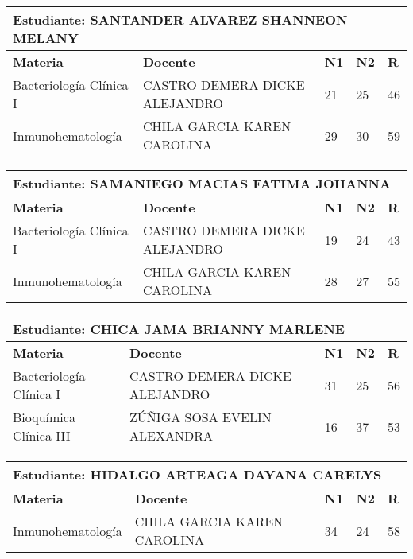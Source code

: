 \small
\begin{tabularx}{\textwidth}{|p{5cm}|p{7cm}|X|X|X|}
\hline
\multicolumn{5}{|p{\dimexpr\textwidth-2\tabcolsep-2\arrayrulewidth}|}{\textbf{Estudiante: SANTANDER ALVAREZ SHANNEON MELANY }}\\\hline
\textbf{Materia} & \textbf{Docente} & \textbf{N1} & \textbf{N2} & \textbf{R} \\ \hline
Bacteriología Clínica I & CASTRO DEMERA DICKE ALEJANDRO  & 21 & 25& 46 \\ \hline
Inmunohematología & CHILA GARCIA KAREN CAROLINA  & 29 & 30& 59 \\ \hline
\end{tabularx}\vspace{10mm}
\small
\begin{tabularx}{\textwidth}{|p{5cm}|p{7cm}|X|X|X|}
\hline
\multicolumn{5}{|p{\dimexpr\textwidth-2\tabcolsep-2\arrayrulewidth}|}{\textbf{Estudiante: SAMANIEGO MACIAS FATIMA JOHANNA }}\\\hline
\textbf{Materia} & \textbf{Docente} & \textbf{N1} & \textbf{N2} & \textbf{R} \\ \hline
Bacteriología Clínica I & CASTRO DEMERA DICKE ALEJANDRO  & 19 & 24& 43 \\ \hline
Inmunohematología & CHILA GARCIA KAREN CAROLINA  & 28 & 27& 55 \\ \hline
\end{tabularx}\vspace{10mm}
\small
\begin{tabularx}{\textwidth}{|p{5cm}|p{7cm}|X|X|X|}
\hline
\multicolumn{5}{|p{\dimexpr\textwidth-2\tabcolsep-2\arrayrulewidth}|}{\textbf{Estudiante: CHICA JAMA BRIANNY MARLENE }}\\\hline
\textbf{Materia} & \textbf{Docente} & \textbf{N1} & \textbf{N2} & \textbf{R} \\ \hline
Bacteriología Clínica I & CASTRO DEMERA DICKE ALEJANDRO  & 31 & 25& 56 \\ \hline
Bioquímica Clínica III & ZÚÑIGA SOSA EVELIN ALEXANDRA  & 16 & 37& 53 \\ \hline
\end{tabularx}\vspace{10mm}
\small
\begin{tabularx}{\textwidth}{|p{5cm}|p{7cm}|X|X|X|}
\hline
\multicolumn{5}{|p{\dimexpr\textwidth-2\tabcolsep-2\arrayrulewidth}|}{\textbf{Estudiante: HIDALGO ARTEAGA DAYANA CARELYS }}\\\hline
\textbf{Materia} & \textbf{Docente} & \textbf{N1} & \textbf{N2} & \textbf{R} \\ \hline
Inmunohematología & CHILA GARCIA KAREN CAROLINA  & 34 & 24& 58 \\ \hline
\end{tabularx}\vspace{10mm}

